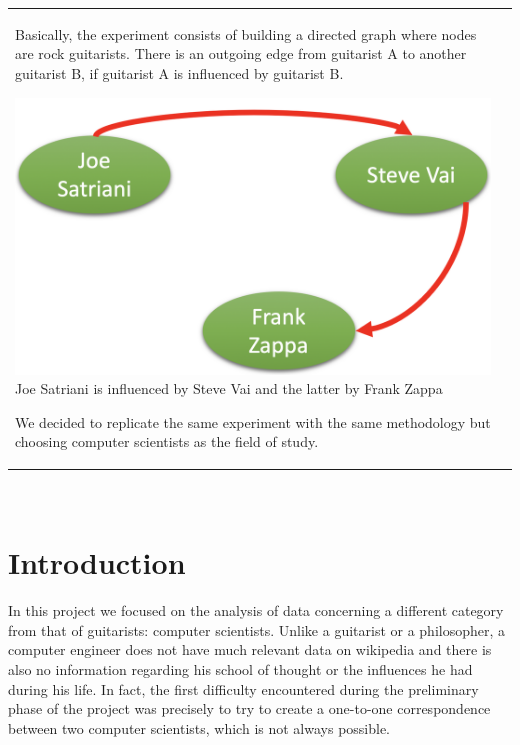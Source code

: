 \documentclass[12pt, twoside]{article}
\begin{document}
\begin{titlepage}
\begin{tabular}{p{6cm} p{10cm}}
Basically, the experiment consists of building a directed graph where nodes are rock guitarists. There is an outgoing edge from guitarist A to another guitarist B, if guitarist A is influenced by guitarist B.
\begin{center}
\includegraphics[scale=0.22]{images/guitar_influences}	
\linebreak
\scriptsize Joe Satriani is influenced by Steve Vai and the latter by Frank Zappa
\end{center}
We decided to replicate the same experiment with the same methodology but choosing computer scientists as the field of study.

\end{tabular}
\end{titlepage}

\tableofcontents
$\ $

\newpage
\section{Introduction}
In this project we focused on the analysis of data concerning a different category from that of guitarists: computer scientists. Unlike a guitarist or a philosopher, a computer engineer does not have much relevant data on wikipedia and there is also no information regarding his school of thought or the influences he had during his life. In fact, the first difficulty encountered during the preliminary phase of the project was precisely to try to create a one-to-one correspondence between two computer scientists, which is not always possible.
\end{document}
